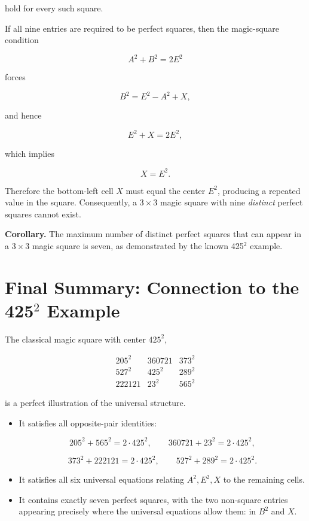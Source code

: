 \documentclass[12pt]{article}
\begin{document}
hold for every such square.

If all nine entries are required to be perfect squares, then the
magic-square condition


\[
A^2 + B^2 = 2E^2
\]


forces


\[
B^2 = E^2 - A^2 + X,
\]


and hence


\[
E^2 + X = 2E^2,
\]


which implies


\[
X = E^2.
\]



Therefore the bottom-left cell $X$ must equal the center $E^2$, producing
a repeated value in the square.  
Consequently, a $3\times 3$ magic square with nine \emph{distinct}
perfect squares cannot exist.

\textbf{Corollary.}
The maximum number of distinct perfect squares that can appear in a
$3\times 3$ magic square is seven, as demonstrated by the known
425$^2$ example.


\section*{Final Summary: Connection to the 425$^2$ Example}

The classical magic square with center $425^2$,


\[
\begin{matrix}
205^2   & 360721 & 373^2 \\
527^2   & 425^2  & 289^2 \\
222121  & 23^2   & 565^2
\end{matrix}
\]


is a perfect illustration of the universal structure.

\begin{itemize}
  \item It satisfies all opposite-pair identities:
  

\[
  205^2 + 565^2 = 2\cdot 425^2,\qquad
  360721 + 23^2 = 2\cdot 425^2,
  \]


  

\[
  373^2 + 222121 = 2\cdot 425^2,\qquad
  527^2 + 289^2 = 2\cdot 425^2.
  \]



  \item It satisfies all six universal equations relating
        $A^2, E^2, X$ to the remaining cells.

  \item It contains exactly seven perfect squares, with the two
        non-square entries appearing precisely where the universal
        equations allow them: in $B^2$ and $X$.
\end{itemize}
\end{document}
